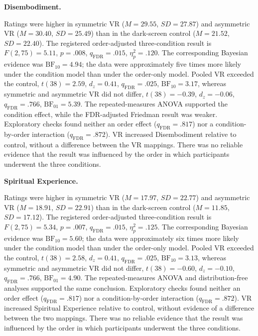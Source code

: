 \documentclass[pdflatex,sn-basic,lineno]{../sn-jnl}
\begin{document}
\medskip\noindent\textbf{Disembodiment.}\nopagebreak[4]

Ratings were higher in symmetric VR ($M=29.55$, $SD=27.87$) and asymmetric VR ($M=30.40$, $SD=25.49$) than in the dark-screen control ($M=21.52$, $SD=22.40$). The registered order-adjusted three-condition result is $F(2,75)=5.11$, $p=.008$, $q_{\mathrm{FDR}}=.015$, $\eta_p^2=.120$. The corresponding Bayesian evidence was $\mathrm{BF}_{10}=4.94$; the data were approximately five times more likely under the condition model than under the order-only model. Pooled VR exceeded the control, $t(38)=2.59$, $d_z=0.41$, $q_{\mathrm{FDR}}=.025$, $\mathrm{BF}_{10}=3.17$, whereas symmetric and asymmetric VR did not differ, $t(38)=-0.39$, $d_z=-0.06$, $q_{\mathrm{FDR}}=.766$, $\mathrm{BF}_{01}=5.39$. The repeated-measures ANOVA supported the condition effect, while the FDR-adjusted Friedman result was weaker. Exploratory checks found neither an order effect ($q_{\mathrm{FDR}}=.817$) nor a condition-by-order interaction ($q_{\mathrm{FDR}}=.872$). VR increased Disembodiment relative to control, without a difference between the VR mappings. There was no reliable evidence that the result was influenced by the order in which participants underwent the three conditions.

\medskip\noindent\textbf{Spiritual Experience.}\nopagebreak[4]

Ratings were higher in symmetric VR ($M=17.97$, $SD=22.77$) and asymmetric VR ($M=18.91$, $SD=22.91$) than in the dark-screen control ($M=11.85$, $SD=17.12$). The registered order-adjusted three-condition result is $F(2,75)=5.34$, $p=.007$, $q_{\mathrm{FDR}}=.015$, $\eta_p^2=.125$. The corresponding Bayesian evidence was $\mathrm{BF}_{10}=5.60$; the data were approximately six times more likely under the condition model than under the order-only model. Pooled VR exceeded the control, $t(38)=2.58$, $d_z=0.41$, $q_{\mathrm{FDR}}=.025$, $\mathrm{BF}_{10}=3.13$, whereas symmetric and asymmetric VR did not differ, $t(38)=-0.60$, $d_z=-0.10$, $q_{\mathrm{FDR}}=.766$, $\mathrm{BF}_{01}=4.90$. The repeated-measures ANOVA and distribution-free analyses supported the same conclusion. Exploratory checks found neither an order effect ($q_{\mathrm{FDR}}=.817$) nor a condition-by-order interaction ($q_{\mathrm{FDR}}=.872$). VR increased Spiritual Experience relative to control, without evidence of a difference between the two mappings. There was no reliable evidence that the result was influenced by the order in which participants underwent the three conditions.
\end{document}

